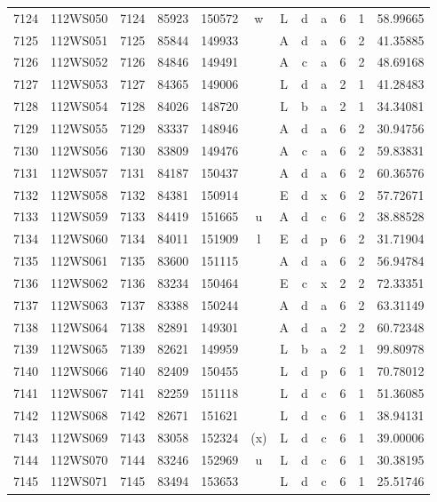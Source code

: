 \begin{tabular}{|*{12}{c|}}
7124 & 112WS050 & 7124 & 85923 & 150572 & w & L & d & a & 6 & 1 & 58.99665 \\ 
7125 & 112WS051 & 7125 & 85844 & 149933 &  & A & d & a & 6 & 2 & 41.35885 \\ 
7126 & 112WS052 & 7126 & 84846 & 149491 &  & A & c & a & 6 & 2 & 48.69168 \\ 
7127 & 112WS053 & 7127 & 84365 & 149006 &  & L & d & a & 2 & 1 & 41.28483 \\ 
7128 & 112WS054 & 7128 & 84026 & 148720 &  & L & b & a & 2 & 1 & 34.34081 \\ 
7129 & 112WS055 & 7129 & 83337 & 148946 &  & A & d & a & 6 & 2 & 30.94756 \\ 
7130 & 112WS056 & 7130 & 83809 & 149476 &  & A & c & a & 6 & 2 & 59.83831 \\ 
7131 & 112WS057 & 7131 & 84187 & 150437 &  & A & d & a & 6 & 2 & 60.36576 \\ 
7132 & 112WS058 & 7132 & 84381 & 150914 &  & E & d & x & 6 & 2 & 57.72671 \\ 
7133 & 112WS059 & 7133 & 84419 & 151665 & u & A & d & c & 6 & 2 & 38.88528 \\ 
7134 & 112WS060 & 7134 & 84011 & 151909 & l & E & d & p & 6 & 2 & 31.71904 \\ 
7135 & 112WS061 & 7135 & 83600 & 151115 &  & A & d & a & 6 & 2 & 56.94784 \\ 
7136 & 112WS062 & 7136 & 83234 & 150464 &  & E & c & x & 2 & 2 & 72.33351 \\ 
7137 & 112WS063 & 7137 & 83388 & 150244 &  & A & d & a & 6 & 2 & 63.31149 \\ 
7138 & 112WS064 & 7138 & 82891 & 149301 &  & A & d & a & 2 & 2 & 60.72348 \\ 
7139 & 112WS065 & 7139 & 82621 & 149959 &  & L & b & a & 2 & 1 & 99.80978 \\ 
7140 & 112WS066 & 7140 & 82409 & 150455 &  & L & d & p & 6 & 1 & 70.78012 \\ 
7141 & 112WS067 & 7141 & 82259 & 151118 &  & L & d & c & 6 & 1 & 51.36085 \\ 
7142 & 112WS068 & 7142 & 82671 & 151621 &  & L & d & c & 6 & 1 & 38.94131 \\ 
7143 & 112WS069 & 7143 & 83058 & 152324 & (x) & L & d & c & 6 & 1 & 39.00006 \\ 
7144 & 112WS070 & 7144 & 83246 & 152969 & u & L & d & c & 6 & 1 & 30.38195 \\ 
7145 & 112WS071 & 7145 & 83494 & 153653 &  & L & d & c & 6 & 1 & 25.51746 \\ 

\end{tabular}
